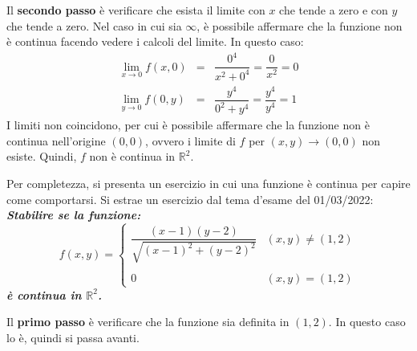 \documentclass[a4paper]{article}
\begin{document}
	\noindent
	Il \textbf{secondo passo} è verificare che esista il limite con $x$ che tende a zero e con $y$ che tende a zero. Nel caso in cui sia $\infty$, è possibile affermare che la funzione non è continua facendo vedere i calcoli del limite. In questo caso:
	\begin{equation*}
		\begin{array}{rcl}
			\displaystyle\lim_{x \rightarrow 0} f\left(x,0\right) &=& \dfrac{0^{4}}{x^{2} + 0^{4}} = \dfrac{0}{x^{2}} = 0 \\ [1.5em]
			\displaystyle\lim_{y \rightarrow 0} f\left(0,y\right) &=& \dfrac{y^{4}}{0^{2} + y^{4}} = \dfrac{y^{4}}{y^{4}} = 1
		\end{array}
	\end{equation*}
	I limiti non coincidono, per cui è possibile affermare che la funzione non è continua nell'origine $\left(0,0\right)$, ovvero i limite di $f$ per $\left(x,y\right) \rightarrow \left(0,0\right)$ non esiste. Quindi, $f$ non è continua in $\mathbb{R}^{2}$.\newline

	\noindent
	Per completezza, si presenta un esercizio in cui una funzione è continua per capire come comportarsi. Si estrae un esercizio dal tema d'esame del 01/03/2022: \textcolor{Green4}{\textbf{\emph{Stabilire se la funzione:}}
	\begin{equation*}
		f\left(x,y\right) = \begin{cases}
			\dfrac{\left(x-1\right)\left(y-2\right)}{\sqrt{\left(x-1\right)^{2} + \left(y-2\right)^{2}}} & \left(x,y\right) \ne \left(1,2\right) \\
			\\
			0	& \left(x,y\right) = \left(1,2\right)
		\end{cases}
	\end{equation*}
	\textbf{\emph{è continua in $\mathbb{R}^{2}$.}}}\newpage

	\noindent
	Il \textbf{primo passo} è verificare che la funzione sia definita in $\left(1,2\right)$. In questo caso lo è, quindi si passa avanti.\newline
\end{document}
